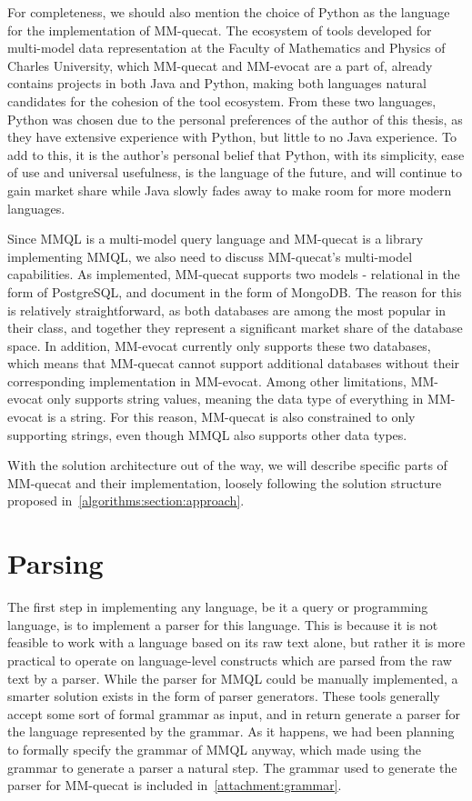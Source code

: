 For completeness, we should also mention the choice of Python as the language for the implementation of MM-quecat.
The ecosystem of tools developed for multi-model data representation at the Faculty of Mathematics and Physics of Charles University, which MM-quecat and MM-evocat are a part of, already contains projects in both Java and Python, making both languages natural candidates for the cohesion of the tool ecosystem.
From these two languages, Python was chosen due to the personal preferences of the author of this thesis, as they have extensive experience with Python, but little to no Java experience.
To add to this, it is the author's personal belief that Python, with its simplicity, ease of use and universal usefulness, is the language of the future, and will continue to gain market share while Java slowly fades away to make room for more modern languages.

Since MMQL is a multi-model query language and MM-quecat is a library implementing MMQL, we also need to discuss MM-quecat's multi-model capabilities.
As implemented, MM-quecat supports two models - relational in the form of PostgreSQL, and document in the form of MongoDB.
The reason for this is relatively straightforward, as both databases are among the most popular in their class, and together they represent a significant market share of the database space.
In addition, MM-evocat currently only supports these two databases, which means that MM-quecat cannot support additional databases without their corresponding implementation in MM-evocat.
Among other limitations, MM-evocat only supports string values, meaning the data type of everything in MM-evocat is a string.
For this reason, MM-quecat is also constrained to only supporting strings, even though MMQL also supports other data types.

With the solution architecture out of the way, we will describe specific parts of MM-quecat and their implementation, loosely following the solution structure proposed in~\cref{algorithms:section:approach}.

\section{Parsing}

The first step in implementing any language, be it a query or programming language, is to implement a parser for this language.
This is because it is not feasible to work with a language based on its raw text alone, but rather it is more practical to operate on language-level constructs which are parsed from the raw text by a parser.
While the parser for MMQL could be manually implemented, a smarter solution exists in the form of parser generators.
These tools generally accept some sort of formal grammar as input, and in return generate a parser for the language represented by the grammar.
As it happens, we had been planning to formally specify the grammar of MMQL anyway, which made using the grammar to generate a parser a natural step.
The grammar used to generate the parser for MM-quecat is included  in~\cref{attachment:grammar}.

